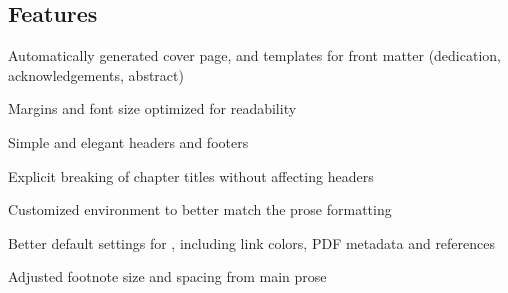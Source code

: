 \documentclass[thesis.tex]{subfiles}
\begin{document}
\subsection*{Features}
\begin{tightemize}
\item Automatically generated cover page, and templates for front matter (dedication, acknowledgements, abstract)
\item Margins and font size optimized for readability
\item Simple and elegant headers and footers
\item Explicit breaking of chapter titles without affecting headers
\item Customized  environment to better match the prose formatting
\item Better default settings for , including link colors, PDF metadata and references
\item Adjusted footnote size and spacing from main prose
\item
\end{tightemize}
\end{document}
